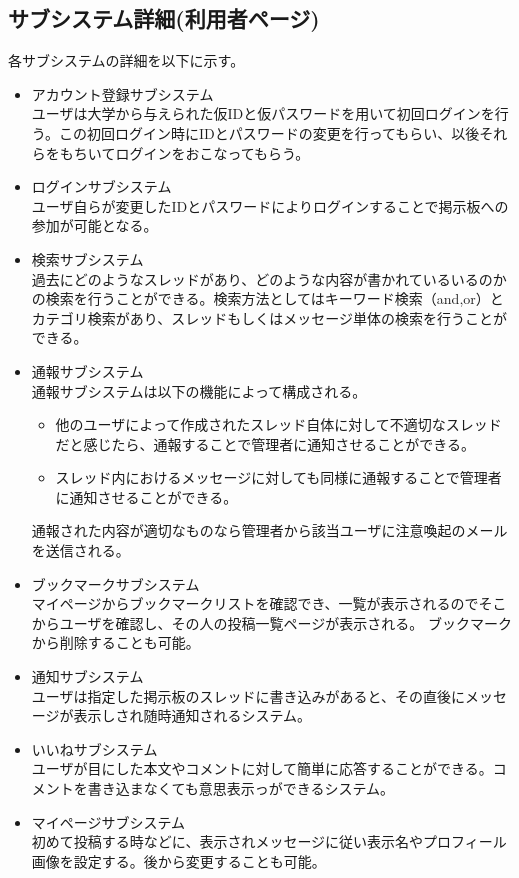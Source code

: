 \documentclass[a4j]{jarticle}
\begin{document}
\subsection{サブシステム詳細(利用者ページ)}
各サブシステムの詳細を以下に示す。
\begin{itemize}
\item アカウント登録サブシステム\\
ユーザは大学から与えられた仮IDと仮パスワードを用いて初回ログインを行う。この初回ログイン時にIDとパスワードの変更を行ってもらい、以後それらをもちいてログインをおこなってもらう。

\item ログインサブシステム\\
ユーザ自らが変更したIDとパスワードによりログインすることで掲示板への参加が可能となる。

\item 検索サブシステム\\
過去にどのようなスレッドがあり、どのような内容が書かれているいるのかの検索を行うことができる。検索方法としてはキーワード検索（and,or）とカテゴリ検索があり、スレッドもしくはメッセージ単体の検索を行うことができる。

\item 通報サブシステム\\
通報サブシステムは以下の機能によって構成される。

\begin{itemize}
\item 他のユーザによって作成されたスレッド自体に対して不適切なスレッドだと感じたら、通報することで管理者に通知させることができる。
\item スレッド内におけるメッセージに対しても同様に通報することで管理者に通知させることができる。\\
\end{itemize}
通報された内容が適切なものなら管理者から該当ユーザに注意喚起のメールを送信される。

\item ブックマークサブシステム\\
マイページからブックマークリストを確認でき、一覧が表示されるのでそこからユーザを確認し、その人の投稿一覧ページが表示される。
ブックマークから削除することも可能。

\item 通知サブシステム\\
ユーザは指定した掲示板のスレッドに書き込みがあると、その直後にメッセージが表示しされ随時通知されるシステム。

\item いいねサブシステム\\
ユーザが目にした本文やコメントに対して簡単に応答することができる。コメントを書き込まなくても意思表示っができるシステム。

\item マイページサブシステム\\
初めて投稿する時などに、表示されメッセージに従い表示名やプロフィール画像を設定する。後から変更することも可能。
\end{itemize}
\end{document}
